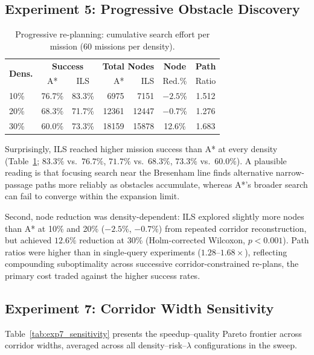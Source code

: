 \documentclass[preprint,12pt,authoryear]{elsarticle}
\begin{document}
\subsection{Experiment 5: Progressive Obstacle Discovery}

\begin{table}[!htbp]
\centering
\caption{Progressive re-planning: cumulative search effort per mission (60 missions per density).}
\label{tab:exp5_progressive}
\begin{tabular}{lccrrcc}
\toprule
\multirow{2}{*}{\textbf{Dens.}} & \multicolumn{2}{c}{\textbf{Success}} & \multicolumn{2}{c}{\textbf{Total Nodes}} & \textbf{Node} & \textbf{Path} \\
& A* & ILS & A* & ILS & Red.\% & Ratio \\
\midrule
10\% & 76.7\% & 83.3\% & 6975 & 7151 & $-2.5$\% & 1.512 \\
20\% & 68.3\% & 71.7\% & 12361 & 12447 & $-0.7$\% & 1.276 \\
30\% & 60.0\% & 73.3\% & 18159 & 15878 & 12.6\% & 1.683 \\
\bottomrule
\end{tabular}
\end{table}

Surprisingly, ILS reached higher mission success than A* at every density (Table~\ref{tab:exp5_progressive}; $83.3\%$ vs.\ $76.7\%$, $71.7\%$ vs.\ $68.3\%$, $73.3\%$ vs.\ $60.0\%$). A plausible reading is that focusing search near the Bresenham line finds alternative narrow-passage paths more reliably as obstacles accumulate, whereas A*'s broader search can fail to converge within the expansion limit.

Second, node reduction was density-dependent: ILS explored slightly more nodes than A* at 10\% and 20\% ($-2.5\%$, $-0.7\%$) from repeated corridor reconstruction, but achieved $12.6\%$ reduction at 30\% (Holm-corrected Wilcoxon, $p < 0.001$). Path ratios were higher than in single-query experiments ($1.28$--$1.68\times$), reflecting compounding suboptimality across successive corridor-constrained re-plans, the primary cost traded against the higher success rates.

\subsection{Experiment 7: Corridor Width Sensitivity}

Table~\ref{tab:exp7_sensitivity} presents the speedup--quality Pareto frontier across corridor widths, averaged across all density--risk--$\lambda$ configurations in the sweep.
\end{document}
